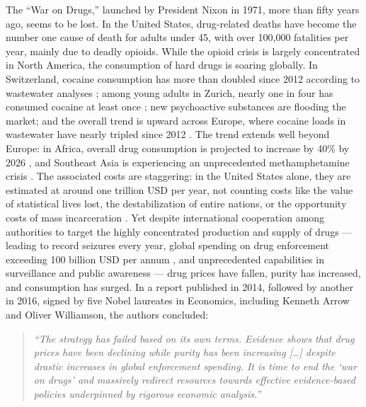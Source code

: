 \documentclass[12pt, a4paper]{article}
\begin{document}

The ``War on Drugs,'' launched by President Nixon in 1971, more than fifty years ago, seems to be lost. In the United States, drug-related deaths have become the number one cause of death for adults under 45, with over 100,000 fatalities per year, mainly due to deadly opioids. While the opioid crisis is largely concentrated in North America, the consumption of hard drugs is soaring globally. In Switzerland, cocaine consumption has more than doubled since 2012 according to wastewater analyses \citep{wastewater_2026}; among young adults in Zurich, nearly one in four has consumed cocaine at least once \citep{quednow_uzh_2025}; new psychoactive substances are flooding the market; and the overall trend is upward across Europe, where cocaine loads in wastewater have nearly tripled since 2012 \citep{wastewater_2026}. The trend extends well beyond Europe: in Africa, overall drug consumption is projected to increase by 40\% by 2026 \citep{africa_2025}, and Southeast Asia is experiencing an unprecedented methamphetamine crisis \citep{asia_2025}. The associated costs are staggering: in the United States alone, they are estimated at around one trillion USD per year, not counting costs like the value of statistical lives lost, the destabilization of entire nations, or the opportunity costs of mass incarceration \citep{ncdas_2025, whitehouse_opioid_2025}. Yet despite international cooperation among authorities to target the highly concentrated production and supply of drugs --- leading to record seizures every year, global spending on drug enforcement exceeding 100 billion USD per annum \citep{count_costs_2013}, and unprecedented capabilities in surveillance and public awareness --- drug prices have fallen, purity has increased, and consumption has surged. In a report published in 2014, followed by another in 2016, signed by five Nobel laureates in Economics, including Kenneth Arrow and Oliver Williamson, the authors concluded:

\begin{quote}
\textit{``The strategy has failed based on its own terms. Evidence shows 
that drug prices have been declining while purity has been increasing 
[\ldots] despite drastic increases in global enforcement spending. It is 
time to end the `war on drugs' and massively redirect resources towards 
effective evidence-based policies underpinned by rigorous economic 
analysis.''} \citep{lse_2014}
\end{quote}
\end{document}
